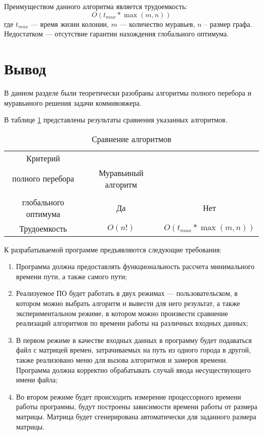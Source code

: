 Преимуществом данного алгоритма является трудоемкость:
$$O(t_{max}* \max(m, n))$$
где $t_{max}$ --- время жизни колонии, $m$ --- количество муравьев, $n$ -- размер графа.
Недостатком --- отсутствие гарантии нахождения глобального оптимума. 

\section{Вывод}

В данном разделе были теоретически разобраны алгоритмы полного перебора и муравьиного решения задачи коммивояжера.

В таблице \ref{tbl:cmp} представлены результаты сравнения указанных алгоритмов.
\begin{center}
\captionsetup{justification=raggedright,singlelinecheck=off}
\begin{longtable}{|c|c|c|}
	\caption{\label{tbl:cmp}Сравнение алгоритмов}\\
	\hline
	Критерий & \begin{tabular}{c}
		Алгоритм\\
		полного перебора
	\end{tabular} & Муравьиный алгоритм\\
	\hline
	\begin{tabular}{c}
		Гарантия нахождения\\
		глобального оптимума
	\end{tabular}
	  & Да & Нет\\ 
	\hline
	Трудоемкость & $O(n!)$ & $O(t_{max}* \max(m, n))$\\
	\hline
\end{longtable}
\end{center}

К разрабатываемой программе предъявляются следующие требования:
\begin{enumerate}
	\item Программа должна предоставлять функциональность рассчета минимального времени пути, а также самого пути;
	
	\item Реализуемое ПО будет работать в двух режимах --- пользовательском, в котором можно выбрать алгоритм и вывести для него результат, а также экспериментальном режиме, в котором можно произвести сравнение реализаций алгоритмов по времени работы на различных входных данных;
	
	\item В первом режиме в качестве входных данных в программу будет подаваться файл с матрицей времен, затрачиваемых на путь из одного города в другой, также реализовано меню для вызова алгоритмов и замеров времени. Программа должна корректно обрабатывать случай ввода несуществующего имени файла;
	
	\item Во втором режиме будет происходить измерение процессорного времени работы программы, будут построены зависимости времени работы от размера матрицы. Матрица будет сгенерирована автоматически для заданного размера матрицы.
\end{enumerate}